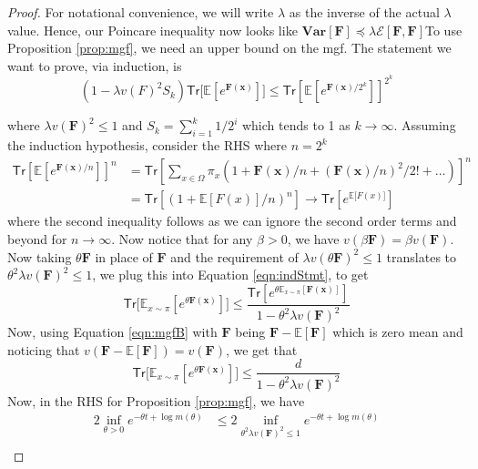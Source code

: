 \begin{proof}
  For notational convenience, we will write $\lambda$ as the inverse of the actual $\lambda$ value. Hence, our Poincare inequality now looks like $\mathbf{Var}[\mathbf{F}]\preceq\lambda\mathcal{E}[\mathbf{F},\mathbf{F}]$To use Proposition \ref{prop:mgf}, we need an upper bound on the mgf. The statement we want to prove, via induction, is \begin{equation}\label{eqn:indStmt}
  (1-\lambda v(F)^2 S_k )\mathsf{Tr}\big[\mathbb{E}[e^{\mathbf{F(x)}}]\big]\leq  \mathsf{Tr}[\mathbb{E}[e^{\mathbf{F(x)}/2^k}]]^{2^k}
\end{equation}

where $\lambda v(\mathbf{F})^2 \leq 1$ and $S_k = \sum\limits_{i=1}^{k}1/2^i$ which tends to 1 as $k \rightarrow \infty$.
Assuming the induction hypothesis, consider the RHS where $n=2^k$
\begin{align*}
  \mathsf{Tr}[\mathbb{E}[e^{\mathbf{F(x)}/n}]]^n&=\mathsf{Tr}[\sum\limits_{x \in \Omega}\pi_x (1+\mathbf{F(x)}/n + (\mathbf{F(x)}/n)^2/2!+\ldots)]^n\\
  &=\mathsf{Tr}[(1 + \mathbb{E}[F(x)]/n)^n] \rightarrow \mathsf{Tr}[e^{\mathbb{E}\mathbf[F(x)]}]
\end{align*}
where the second inequality follows as we can ignore the second order terms and beyond for $n\rightarrow \infty$.
Now notice that for any $\beta > 0$, we have $v(\beta \mathbf{F}) = \beta v(\mathbf{F})$. Now taking $\theta \mathbf{F}$ in place of $\mathbf{F}$ and the requirement of $\lambda v(\theta \mathbf{F})^2 \leq 1$ translates to $\theta^2 \lambda v(\mathbf{F})^2 \leq 1$, we plug this into Equation \ref{eqn:indStmt}, to get
\begin{equation}\label{eqn:mgfB}
  \mathsf{Tr}\big[\mathbb{E}_{x \sim \pi}[e^{\theta\mathbf{F(x)}}]\big]\leq \frac{\mathsf{Tr}[e^{\theta\mathbb{E}_{x \sim \pi}[\mathbf{F(x)}]}]}{1-\theta^2\lambda v(\mathbf{F})^2}
\end{equation}
Now, using Equation \ref{eqn:mgfB} with $\mathbf{F}$ being $\mathbf{F}-\mathbb{E}[\mathbf{F}]$ which is zero mean and noticing that $v(\mathbf{F}-\mathbb{E}[\mathbf{F}]) = v(\mathbf{F})$, we get that
\begin{equation}\label{eqn:mgfBo}
  \mathsf{Tr}\big[\mathbb{E}_{x \sim \pi}[e^{\theta\mathbf{F(x)}}]\big]\leq \frac{d}{1-\theta^2\lambda v(\mathbf{F})^2}
\end{equation}
Now, in the RHS for Proposition \ref{prop:mgf}, we have
\begin{align*}
  2\inf\limits_{\theta>0}e^{-\theta t + \log m(\theta)}&\leq 2\inf\limits_{\theta^2 \lambda v(\mathbf{F})^2\leq 1}e^{-\theta t + \log m(\theta)}\\

\end{align*}
\end{proof}
